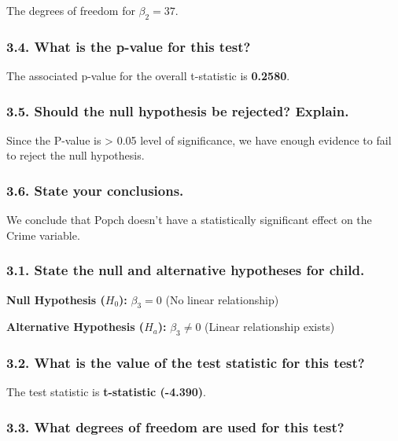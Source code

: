 \documentclass[
]{article}
\begin{document}
The degrees of freedom for \(\beta_2 = 37\).

\subsubsection{3.4. What is the p-value for this
test?}\label{what-is-the-p-value-for-this-test-2}

The associated p-value for the overall t-statistic is \textbf{0.2580}.

\subsubsection{3.5. Should the null hypothesis be rejected?
Explain.}\label{should-the-null-hypothesis-be-rejected-explain.-2}

Since the P-value is \textgreater{} 0.05 level of significance, we have
enough evidence to fail to reject the null hypothesis.

\subsubsection{3.6. State your
conclusions.}\label{state-your-conclusions.-2}

We conclude that Popch doesn't have a statistically significant effect
on the Crime variable.

\subsubsection{3.1. State the null and alternative hypotheses for
child.}\label{state-the-null-and-alternative-hypotheses-for-child.}

\textbf{Null Hypothesis (\(H_0\)):} \(\beta_3 = 0\) (No linear
relationship)

\textbf{Alternative Hypothesis (\(H_a\)):} \(\beta_3 \neq 0\) (Linear
relationship exists)

\subsubsection{3.2. What is the value of the test statistic for this
test?}\label{what-is-the-value-of-the-test-statistic-for-this-test-3}

The test statistic is \textbf{t-statistic (-4.390)}.

\subsubsection{3.3. What degrees of freedom are used for this
test?}\label{what-degrees-of-freedom-are-used-for-this-test-3}
\end{document}
